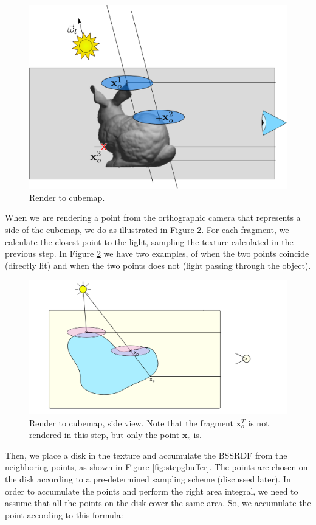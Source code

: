 \begin{figure}[!ht]
\centering
\includegraphics[width=0.5 \linewidth]{images/method/step2}
\caption{Render to cubemap.}
\label{fig:step2}
\end{figure} 

When we are rendering a point from the orthographic camera that represents a side of the cubemap, we do as illustrated in Figure \ref{fig:stepfrustum}. For each fragment, we calculate the closest point to the light, sampling the texture calculated in the previous step. In Figure  \ref{fig:stepfrustum} we have two examples, of when the two points coincide (directly lit) and when the two points does not (light passing through the object). 

\begin{figure}[!ht]
\centering
\includegraphics[width=\linewidth]{images/method/method_frustumside}
\caption{Render to cubemap, side view. Note that the fragment $\mathbf{x}^T_o$ is not rendered in this step, but only the point $\mathbf{x}_o$ is.}
\label{fig:stepfrustum}
\end{figure} 


Then, we place a disk in the texture and accumulate the BSSRDF from the neighboring points, as shown in Figure \ref{fig:stepgbuffer}. The points are chosen on the disk according to a pre-determined sampling scheme (discussed later). In order to accumulate the points and perform the right area integral, we need to assume that all the points on the disk cover the same area. So, we accumulate the point according to this formula:


